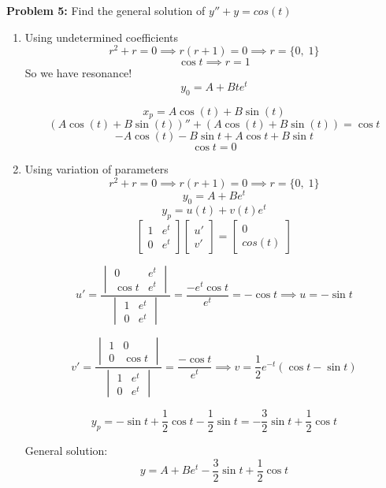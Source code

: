 \documentclass[12pt]{article}
\begin{document}
\textbf{Problem 5:} Find the general solution of $y'' + y = cos(t)$
\begin{enumerate}
    \item Using undetermined coefficients
    \[r^2 + r = 0 \implies r(r + 1) = 0 \implies r = \{0, \; 1\}\]
    \[\cos t \implies r = 1\]
    So we have resonance! 
    \[y_0 = A + Bte^{t}\]

    \[x_p = A\cos(t) + B\sin(t)\]
    \[(A\cos(t) + B\sin(t))'' + (A\cos(t) + B\sin(t)) = \cos t\]
    \[-A\cos(t) - B\sin t + A \cos t + B \sin t\]
    \[\cos t = 0\]
    
    \item Using variation of parameters
    \[r^2 + r = 0 \implies r(r + 1) = 0 \implies r = \{0, \; 1\}\]
    \[y_0 = A + Be^t\]
    \[y_p = u(t) + v(t) e^t\]
    \[\begin{bmatrix}
        1 & e^t\\
        0 & e^t
    \end{bmatrix} \begin{bmatrix}
        u'\\
        v'
    \end{bmatrix} = \begin{bmatrix}
        0\\
        cos(t)
    \end{bmatrix}\]

    \[u' = \frac{\begin{vmatrix}
        0 & e^t\\
        \cos t & e^t
    \end{vmatrix}}{\begin{vmatrix}
        1 & e^t\\
        0 & e^t
    \end{vmatrix}} = \frac{-e^t\cos t}{e^t} = - \cos t \implies u = - \sin t\]

    \[v' = \frac{\begin{vmatrix}
        1 & 0\\
        0 & \cos t
    \end{vmatrix}}{\begin{vmatrix}
        1 & e^t\\
        0 & e^t
    \end{vmatrix}} = \frac{-\cos t}{e^t} \implies v = \frac{1}{2}e^{-t}\left(\cos t - \sin t\right) \]
    
    \[y_p = -\sin t + \frac{1}{2} \cos t - \frac{1}{2} \sin t = -\frac{3}{2}\sin t + \frac{1}{2} \cos t\]

    General solution:
    \[\boxed{y = A + Be^t -\frac{3}{2}\sin t + \frac{1}{2} \cos t }\]
\end{enumerate}
\end{document}
